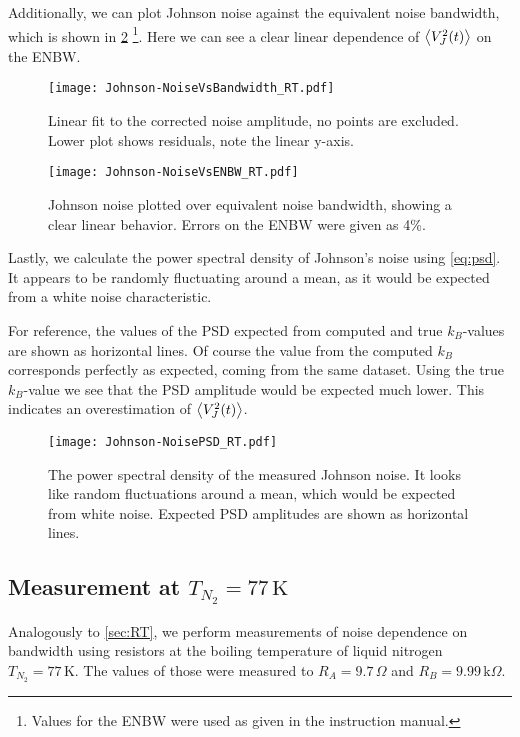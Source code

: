 Additionally, we can plot Johnson noise against the equivalent noise bandwidth, which is shown in \cref{fig:Johnson-NoiseVsENBW_RT.pdf} \footnote{Values for the ENBW were used as given in the instruction manual.}. Here we can see a clear linear dependence of $\expval{V_J^2(t)}$ on the ENBW.

\begin{figure}[H]
	\centering
	\texttt{[image: Johnson-NoiseVsBandwidth\_RT.pdf]}
	\caption{Linear fit to the corrected noise amplitude, no points are excluded. Lower plot shows residuals, note the linear y-axis.}
	\label{fig:Johnson-NoiseVsBandwidth_RT.pdf}
\end{figure}


\begin{figure}[H]
	\centering
	\texttt{[image: Johnson-NoiseVsENBW\_RT.pdf]}
	\caption{Johnson noise plotted over equivalent noise bandwidth, showing a clear linear behavior. Errors on the ENBW were given as 4\%.}
	\label{fig:Johnson-NoiseVsENBW_RT.pdf}
\end{figure}

Lastly, we calculate the power spectral density of Johnson's noise using \cref{eq:psd}. It appears to be randomly fluctuating around a mean, as it would be expected from a white noise characteristic.

For reference, the values of the PSD expected from computed and true $k_B$-values are shown as horizontal lines. Of course the value from the computed $k_B$ corresponds perfectly as expected, coming from the same dataset. Using the true $k_B$-value we see that the PSD amplitude would be expected much lower. This indicates an overestimation of $\expval{V_J^2(t)}$.

\begin{figure}[H]
	\centering
	\texttt{[image: Johnson-NoisePSD\_RT.pdf]}
	\caption{The power spectral density of the measured Johnson noise. It looks like random fluctuations around a mean, which would be expected from white noise. Expected PSD amplitudes are shown as horizontal lines.}
	\label{fig:Johnson-NoisePSD_RT.pdf}
\end{figure}



\subsection{Measurement at $T_{N_2}=77 \, \mathrm{K}$}

Analogously to \cref{sec:RT}, we perform measurements of noise dependence on bandwidth using resistors at the boiling temperature of liquid nitrogen $T_{N_2}=77 \, \mathrm{K}$. The values of those were measured to $R_A = 9.7 \,\Omega$ and $R_B = 9.99 \,\mathrm{k}\Omega$.

